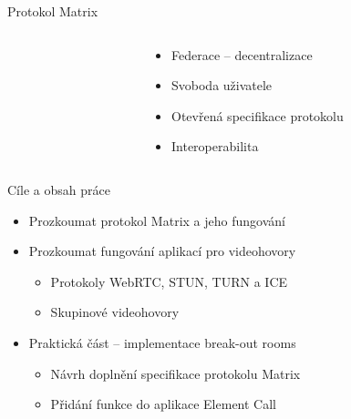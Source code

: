 \documentclass[aspectratio=169]{beamer}
\begin{document}
\begin{frame}{Protokol Matrix}
    \pause
    \begin{columns}
        \begin{column}{0.5\textwidth}
            \centering
        \end{column}
        \begin{column}{0.5\textwidth}
            \begin{itemize}[<+->]
                \item Federace -- decentralizace
                \item Svoboda uživatele
                \item Otevřená specifikace protokolu
                \item Interoperabilita
            \end{itemize}
        \end{column}
    \end{columns}
\end{frame}
\begin{frame}{Cíle a obsah práce}
    \pause
    \begin{itemize}[<+->]
        \item Prozkoumat protokol Matrix a jeho fungování
        \item Prozkoumat fungování aplikací pro videohovory
              \begin{itemize}
                  \item Protokoly WebRTC, STUN, TURN a ICE
                  \item Skupinové videohovory
              \end{itemize}
        \item Praktická část -- implementace break-out rooms
              \begin{itemize}
                  \item Návrh doplnění specifikace protokolu Matrix
                  \item Přidání funkce do aplikace Element Call
              \end{itemize}
    \end{itemize}
\end{frame}
\end{document}
